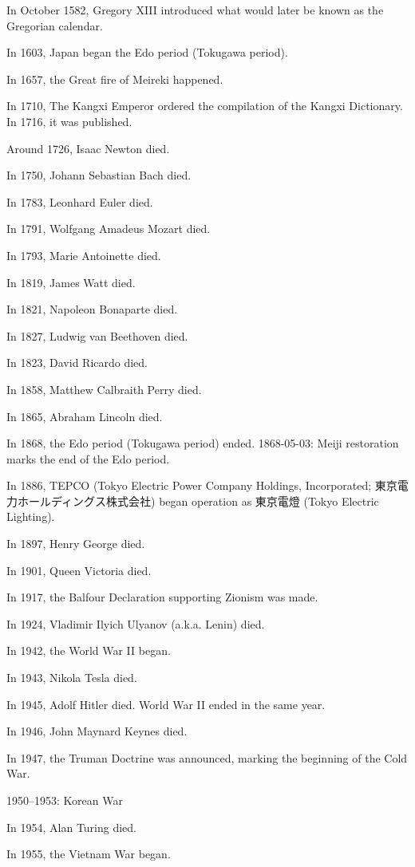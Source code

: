 In October 1582, Gregory XIII introduced
what would later be known as the Gregorian calendar.

In 1603, Japan began the Edo period (Tokugawa period).

In 1657, the Great fire of Meireki happened.

In 1710, The Kangxi Emperor ordered the compilation of the Kangxi Dictionary.
In 1716, it was published.

Around 1726, Isaac Newton died.

In 1750, Johann Sebastian Bach died.

In 1783, Leonhard Euler died.

In 1791, Wolfgang Amadeus Mozart died.

In 1793, Marie Antoinette died.

In 1819, James Watt died.

In 1821, Napoleon Bonaparte died.

In 1827, Ludwig van Beethoven died.

In 1823, David Ricardo died.

In 1858, Matthew Calbraith Perry died.

In 1865, Abraham Lincoln died.

In 1868, the Edo period (Tokugawa period) ended.
1868-05-03: Meiji restoration marks the end of the Edo period.

In 1886, TEPCO
(Tokyo Electric Power Company Holdings, Incorporated; 東京電力ホールディングス株式会社)
began operation as 東京電燈 (Tokyo Electric Lighting).

In 1897, Henry George died.

In 1901, Queen Victoria died.

In 1917, the Balfour Declaration supporting Zionism was made.

In 1924, Vladimir Ilyich Ulyanov (a.k.a. Lenin) died.

In 1942, the World War II began.

In 1943, Nikola Tesla died.

In 1945, Adolf Hitler died.
World War II ended in the same year.

In 1946, John Maynard Keynes died.

In 1947, the Truman Doctrine was announced,
marking the beginning of the Cold War.

1950--1953: Korean War

In 1954, Alan Turing died.

In 1955, the Vietnam War began.

